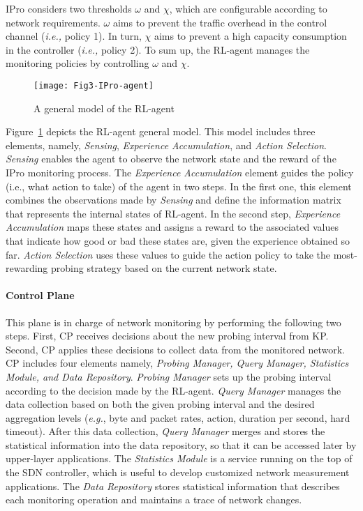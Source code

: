 IPro considers two thresholds $\omega$ and $\chi$, which are configurable according to network requirements. $\omega$ aims to prevent the traffic overhead in the control channel (\textit{i.e.,} policy 1). In turn, $\chi$ aims to prevent a high capacity consumption in the controller (\textit{i.e.,} policy 2). To sum up, the RL-agent manages the monitoring policies by controlling $\omega$ and $\chi$.

\begin{figure}[h!]
    \centering
    \texttt{[image: Fig3-IPro-agent]}
    \caption{A general model of the RL-agent}
    \label{fig:ipro_agent}
\end{figure}

Figure~\ref{fig:ipro_agent} depicts the RL-agent general model. This model includes three elements, namely, \textit{Sensing}, \textit{Experience Accumulation}, and \textit{Action Selection}. \textit{Sensing} enables the agent to observe the network state and the reward of the IPro monitoring process. The \textit{Experience Accumulation} element guides the policy (i.e., what action to take) of the agent in two steps. In the first one, this element combines the observations made by \textit{Sensing} and define the information matrix that represents the internal states of RL-agent. In the second step, \textit{Experience Accumulation} maps these states and assigns a reward to the associated values that indicate how good or bad these states are, given the experience obtained so far. \textit{Action Selection} uses these values to guide the action policy to take the most-rewarding probing strategy based on the current network state.

\paragraph{\textbf{Control Plane}} 
This plane is in charge of network monitoring by performing the following two steps. First, CP receives decisions about the new probing interval from KP. Second, CP applies these decisions to collect data from the monitored network. CP includes four elements namely, \textit{Probing Manager, Query Manager, Statistics Module, and Data Repository}. \textit{Probing Manager} sets up the probing interval according to the decision made by the RL-agent. \textit{Query Manager} manages the data collection based on both the given probing interval and the desired aggregation levels (\textit{e.g.}, byte and packet rates, action, duration per second, hard timeout). After this data collection, \textit{Query Manager} merges and stores the statistical information into the data repository, so that it can be accessed later by upper-layer applications. The \textit{Statistics Module} is a service running on the top of the SDN controller, which is useful to develop customized network measurement applications. The \textit{Data Repository} stores statistical information that describes each monitoring operation and maintains a trace of network changes.

